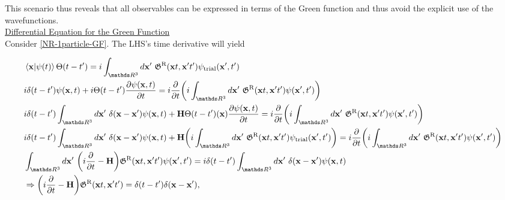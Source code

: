 \documentclass{homework}
\begin{document}
This scenario thus reveals that all observables can be expressed in terms of the Green function and thus avoid the explicit use of the wavefunctions. \\

\underline{Differential Equation for the Green Function} \\

Consider \cref{NR-1particle-GF}. The LHS's time derivative will yield

\begin{equation}
    \begin{split}
        &\bra{{\bf x}} \ket{\psi(t)} \Theta(t-t') = i \int_{\R^3} d{\bf x}' \blanky \mathfrak{G}^{\textnormal{R}}({\bf x}t, {\bf x}'t') \psi_{\textnormal{trial}}({\bf x}', t') \\
        &i \delta(t-t') \psi({\bf x}, t) + i \Theta(t-t') \frac{\partial \psi({\bf x}, t)}{\partial t} = i \frac{\partial}{\partial t} \bigg(i \int_{\R^3} d{\bf x}' \blanky \mathfrak{G}^{\textnormal{R}}({\bf x}t, {\bf x}'t') \psi({\bf x}', t') \bigg) \\
        & i \delta(t-t') \int_{\R^3} d{\bf x}' \blanky \delta({\bf x}- {\bf x}') \psi({\bf x}, t) + {\bf H} \Theta(t-t') ({\bf x}) \frac{\partial \psi({\bf x}, t)}{\partial t} = i \frac{\partial}{\partial t} \bigg(i \int_{\R^3} d{\bf x}' \blanky \mathfrak{G}^{\textnormal{R}}({\bf x}t, {\bf x}'t') \psi({\bf x}', t') \bigg) \\
        & i \delta(t-t') \int_{\R^3} d{\bf x}' \blanky \delta({\bf x}- {\bf x}') \psi({\bf x}, t) + {\bf H} \bigg(i \int_{\R^3} d{\bf x}' \blanky \mathfrak{G}^{\textnormal{R}}({\bf x}t, {\bf x}'t') \psi_{\textnormal{trial}}({\bf x}', t')\bigg) = i \frac{\partial}{\partial t} \bigg(i \int_{\R^3} d{\bf x}' \blanky \mathfrak{G}^{\textnormal{R}}({\bf x}t, {\bf x}'t') \psi({\bf x}', t') \bigg) \\
        &\int_{\R^3} d{\bf x}' \blanky \bigg(i \frac{\partial}{\partial t} - {\bf H}\bigg) \mathfrak{G}^{\textnormal{R}}({\bf x}t, {\bf x}'t') \psi({\bf x}', t') = i \delta(t-t') \int_{\R^3} d{\bf x}' \blanky \delta({\bf x}- {\bf x}') \psi({\bf x}, t) \\
        & \Rightarrow  \bigg(i \frac{\partial}{\partial t} - {\bf H}\bigg) \mathfrak{G}^{\textnormal{R}}({\bf x}t, {\bf x}'t') = \delta(t-t') \delta({\bf x}- {\bf x}'),
    \end{split}
\end{equation}
\end{document}
